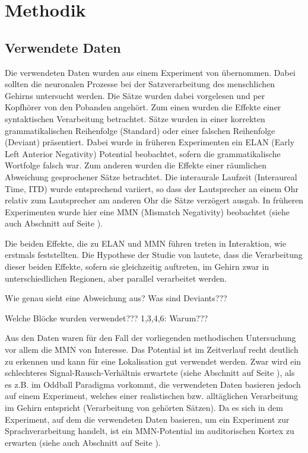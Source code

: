 \documentclass[doc,a4paper,12pt]{apa6}
\makeatletter
\DeclareRobustCommand*{\nameref}[1]{%
      \glqq{\myorg@nameref{#1}}\grqq%
    }%
\makeatother
\begin{document}
\newpage

\section{Methodik}

\subsection{Verwendete Daten}

Die verwendeten Daten wurden aus einem Experiment von \textcite{herrmann2011syntactic} übernommen. Dabei sollten die neuronalen Prozesse bei der Satzverarbeitung des menschlichen Gehirns untersucht werden. Die Sätze wurden dabei vorgelesen und per Kopfhörer von den Pobanden angehört. Zum einen wurden die Effekte einer syntaktischen Verarbeitung betrachtet. Sätze wurden in einer korrekten grammatikalischen Reihenfolge (Standard) oder einer falschen Reihenfolge (Deviant) präsentiert. Dabei wurde in früheren Experimenten ein ELAN (Early Left Anterior Negativity) Potential beobachtet, sofern die grammatikalische Wortfolge falsch war. Zum anderen wurden die Effekte einer räumlichen Abweichung gesprochener Sätze betrachtet. Die interaurale Laufzeit (Interaureal Time, ITD) wurde entsprechend variiert, so dass der Lautsprecher an einem Ohr relativ zum Lautsprecher am anderen Ohr die Sätze verzögert ausgab. In früheren Experimenten wurde hier eine MMN (Mismatch Negativity) beobachtet (siehe auch Abschnitt \nameref{sec:erf} auf Seite \pageref{sec:erf}).

Die beiden Effekte, die zu ELAN und MMN führen treten in Interaktion, wie \textcite{hahne2002differential} erstmals feststellten. Die Hypothese der Studie von \textcite{herrmann2011syntactic} lautete, dass die Verarbeitung dieser beiden Effekte, sofern sie gleichzeitig auftreten, im Gehirn zwar in unterschiedlichen Regionen, aber parallel verarbeitet werden.

Wie genau sieht eine Abweichung aus? Was sind Deviants???

Welche Blöcke wurden verwendet??? 1,3,4,6: Warum???

Aus den Daten waren für den Fall der vorliegenden methodischen Untersuchung vor allem die MMN von Interesse. Das Potential ist im Zeitverlauf recht deutlich zu erkennen und kann für eine Lokalisation gut verwendet werden. Zwar wird ein schlechteres Signal-Rausch-Verhältnis erwartete (siehe Abschnitt \nameref{sec:snr} auf Seite \pageref{sec:snr}), als es z.B. im Oddball Paradigma \parencite{naatanen2004mismatch} vorkommt, die verwendeten Daten basieren jedoch auf einem Experiment, welches einer realistischen bzw. alltäglichen Verarbeitung im Gehirn entspricht (Verarbeitung von gehörten Sätzen). Da es sich in dem Experiment, auf dem die verwendeten Daten basieren, um ein Experiment zur Sprachverarbeitung handelt, ist ein MMN-Potential im auditorischen Kortex zu erwarten (siehe auch Abschnitt \nameref{sec:audicort} auf Seite \pageref{sec:audicort}).
\end{document}
